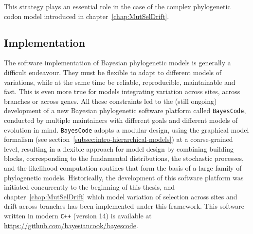This strategy plays an essential role in the case of the complex phylogenetic \gls{codon} model introduced in chapter~\ref{chap:MutSelDrift}.

\subsection{Implementation}
\label{subsec:implementation}

The software implementation of Bayesian phylogenetic models is generally a difficult endeavour.
They must be flexible to adapt to different models of variations, while at the same time be reliable, reproducible, maintainable and fast.
This is even more true for models integrating variation across sites, across branches or across genes.
All these constraints led to the (still ongoing) development of a new Bayesian phylogenetic software platform called \texttt{BayesCode}, conducted by multiple maintainers with different goals and different models of evolution in mind.
\texttt{BayesCode} adopts a modular design, using the graphical model formalism (see section~\ref{subsec:intro-hierarchical-models}) at a coarse-grained level, resulting in a flexible approach for model design by combining building blocks, corresponding to the fundamental distributions, the stochastic processes, and the \gls{likelihood} computation routines that form the basis of a large family of phylogenetic models.
Historically, the development of this software platform was initiated concurrently to the beginning of this thesis, and chapter~\ref{chap:MutSelDrift} which model variation of selection across sites and drift across branches has been implemented under this framework.
This software written in modern \texttt{C++} (version 14) is available at \url{https://github.com/bayesiancook/bayescode}.
